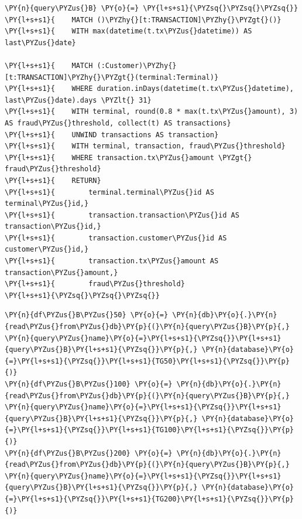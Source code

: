     \begin{tcolorbox}[breakable, size=fbox, boxrule=1pt, pad at break*=1mm,colback=cellbackground, colframe=cellborder]
\begin{Verbatim}[commandchars=\\\{\}]
\PY{n}{query\PYZus{}B} \PY{o}{=} \PY{l+s+s1}{\PYZsq{}\PYZsq{}\PYZsq{}}
\PY{l+s+s1}{    MATCH ()\PYZhy{}[t:TRANSACTION]\PYZhy{}\PYZgt{}()}
\PY{l+s+s1}{    WITH max(datetime(t.tx\PYZus{}datetime)) AS last\PYZus{}date}

\PY{l+s+s1}{    MATCH (:Customer)\PYZhy{}[t:TRANSACTION]\PYZhy{}\PYZgt{}(terminal:Terminal)}
\PY{l+s+s1}{    WHERE duration.inDays(datetime(t.tx\PYZus{}datetime), last\PYZus{}date).days \PYZlt{} 31}
\PY{l+s+s1}{    WITH terminal, round(0.8 * max(t.tx\PYZus{}amount), 3) AS fraud\PYZus{}threshold, collect(t) AS transactions}
\PY{l+s+s1}{    UNWIND transactions AS transaction}
\PY{l+s+s1}{    WITH terminal, transaction, fraud\PYZus{}threshold}
\PY{l+s+s1}{    WHERE transaction.tx\PYZus{}amount \PYZgt{} fraud\PYZus{}threshold}
\PY{l+s+s1}{    RETURN}
\PY{l+s+s1}{        terminal.terminal\PYZus{}id AS terminal\PYZus{}id,}
\PY{l+s+s1}{        transaction.transaction\PYZus{}id AS transaction\PYZus{}id,}
\PY{l+s+s1}{        transaction.customer\PYZus{}id AS customer\PYZus{}id,}
\PY{l+s+s1}{        transaction.tx\PYZus{}amount AS transaction\PYZus{}amount,}
\PY{l+s+s1}{        fraud\PYZus{}threshold}
\PY{l+s+s1}{\PYZsq{}\PYZsq{}\PYZsq{}}
\end{Verbatim}
\end{tcolorbox}

    \begin{tcolorbox}[breakable, size=fbox, boxrule=1pt, pad at break*=1mm,colback=cellbackground, colframe=cellborder]
\begin{Verbatim}[commandchars=\\\{\}]
\PY{n}{df\PYZus{}B\PYZus{}50} \PY{o}{=} \PY{n}{db}\PY{o}{.}\PY{n}{read\PYZus{}from\PYZus{}db}\PY{p}{(}\PY{n}{query\PYZus{}B}\PY{p}{,} \PY{n}{query\PYZus{}name}\PY{o}{=}\PY{l+s+s1}{\PYZsq{}}\PY{l+s+s1}{query\PYZus{}B}\PY{l+s+s1}{\PYZsq{}}\PY{p}{,} \PY{n}{database}\PY{o}{=}\PY{l+s+s1}{\PYZsq{}}\PY{l+s+s1}{TG50}\PY{l+s+s1}{\PYZsq{}}\PY{p}{)}
\PY{n}{df\PYZus{}B\PYZus{}100} \PY{o}{=} \PY{n}{db}\PY{o}{.}\PY{n}{read\PYZus{}from\PYZus{}db}\PY{p}{(}\PY{n}{query\PYZus{}B}\PY{p}{,} \PY{n}{query\PYZus{}name}\PY{o}{=}\PY{l+s+s1}{\PYZsq{}}\PY{l+s+s1}{query\PYZus{}B}\PY{l+s+s1}{\PYZsq{}}\PY{p}{,} \PY{n}{database}\PY{o}{=}\PY{l+s+s1}{\PYZsq{}}\PY{l+s+s1}{TG100}\PY{l+s+s1}{\PYZsq{}}\PY{p}{)}
\PY{n}{df\PYZus{}B\PYZus{}200} \PY{o}{=} \PY{n}{db}\PY{o}{.}\PY{n}{read\PYZus{}from\PYZus{}db}\PY{p}{(}\PY{n}{query\PYZus{}B}\PY{p}{,} \PY{n}{query\PYZus{}name}\PY{o}{=}\PY{l+s+s1}{\PYZsq{}}\PY{l+s+s1}{query\PYZus{}B}\PY{l+s+s1}{\PYZsq{}}\PY{p}{,} \PY{n}{database}\PY{o}{=}\PY{l+s+s1}{\PYZsq{}}\PY{l+s+s1}{TG200}\PY{l+s+s1}{\PYZsq{}}\PY{p}{)}
\end{Verbatim}
\end{tcolorbox}


